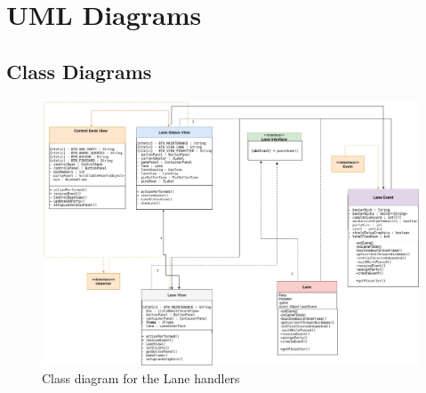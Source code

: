 \section{UML Diagrams}

\subsection{Class Diagrams}

\begin{figure}[H]
    \centering
    \includegraphics[width = \textwidth]{uml/Lane_class.jpg}
    \caption{Class diagram for the Lane handlers}
\end{figure}

